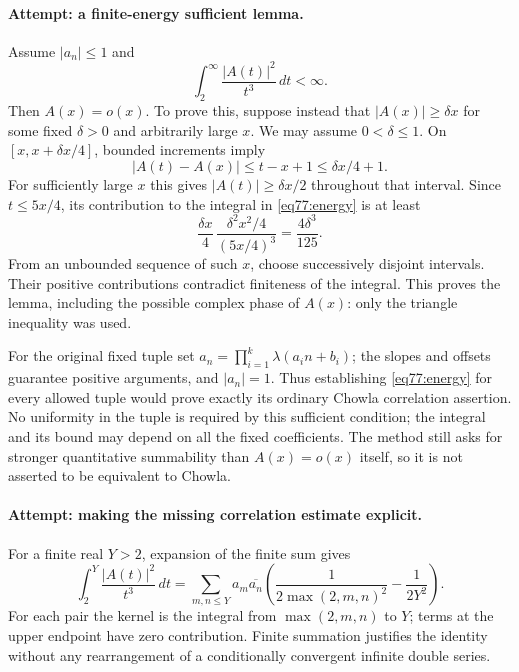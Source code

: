 \documentclass[11pt,a4paper]{article}
\numberwithin{equation}{section}
\begin{document}
\paragraph{Attempt: a finite-energy sufficient lemma.}
Assume $|a_n|\leq1$ and
\begin{equation}\label{eq77:energy}
 \int_2^\infty\frac{|A(t)|^2}{t^3}\,dt<\infty.
\end{equation}
Then $A(x)=o(x)$. To prove this, suppose instead that
$|A(x)|\geq\delta x$ for some fixed $\delta>0$ and arbitrarily large $x$.
We may assume $0<\delta\leq1$. On
$[x,x+\delta x/4]$, bounded increments imply
\[
 |A(t)-A(x)|\leq t-x+1\leq\delta x/4+1.
\]
For sufficiently large $x$ this gives $|A(t)|\geq\delta x/2$ throughout
that interval. Since $t\leq5x/4$, its contribution to the integral in
\eqref{eq77:energy} is at least
\[
 \frac{\delta x}{4}\,
 \frac{\delta^2x^2/4}{(5x/4)^3}
 =\frac{4\delta^3}{125}.
\]
From an unbounded sequence of such $x$, choose successively disjoint
intervals. Their positive contributions contradict finiteness of the
integral. This proves the lemma, including the possible complex phase of
$A(x)$: only the triangle inequality was used.

For the original fixed tuple set
$a_n=\prod_{i=1}^k\lambda(a_i n+b_i)$; the slopes and offsets guarantee
positive arguments, and $|a_n|=1$. Thus establishing
\eqref{eq77:energy} for every allowed tuple would prove exactly its ordinary
Chowla correlation assertion. No uniformity in the tuple is required by
this sufficient condition; the integral and its bound may depend on all
the fixed coefficients. The method still asks for stronger quantitative
summability than $A(x)=o(x)$ itself, so it is not asserted to be equivalent
to Chowla.

\paragraph{Attempt: making the missing correlation estimate explicit.}
For a finite real $Y>2$, expansion of the finite sum gives
\begin{equation}\label{eq77:kernel}
 \int_2^Y\frac{|A(t)|^2}{t^3}\,dt
 =\sum_{m,n\leq Y}a_m\overline{a_n}
 \left(\frac{1}{2\max(2,m,n)^2}-\frac{1}{2Y^2}\right).
\end{equation}
For each pair the kernel is the integral from $\max(2,m,n)$ to $Y$;
terms at the upper endpoint have zero contribution. Finite summation
justifies the identity without any rearrangement of a conditionally
convergent infinite double series.
\end{document}
